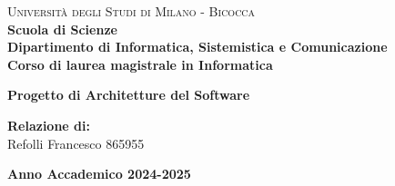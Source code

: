 \documentclass[a4paper,11pt,oneside, table]{article}
\begin{document}
    \begin{titlepage}
        \noindent
        \begin{minipage}[t]{0.19\textwidth}
        \end{minipage}
        \begin{minipage}[t]{0.81\textwidth}
        {
                {\textsc{Università degli Studi di Milano - Bicocca}} \\
                \textbf{Scuola di Scienze} \\
                \textbf{Dipartimento di Informatica, Sistemistica e Comunicazione} \\
                \textbf{Corso di laurea magistrale in Informatica} \\
                \par
        }
        \end{minipage}
    	\vspace{40mm}
    	\begin{center}
            {\LARGE{
                    \textbf{Progetto di Architetture del Software}
                    \par
            }}
        \end{center}
        
        \vspace{50mm}
        
        \vspace{15mm}

        \begin{flushright}
            {\large \textbf{Relazione di:}} \\
            \large{Refolli Francesco} \large{865955}
        \end{flushright}
        
        \vspace{40mm}
        \begin{center}
            {\large{\bf Anno Accademico 2024-2025}}
        \end{center}
        \restoregeometry
    \end{titlepage}
\end{document}
